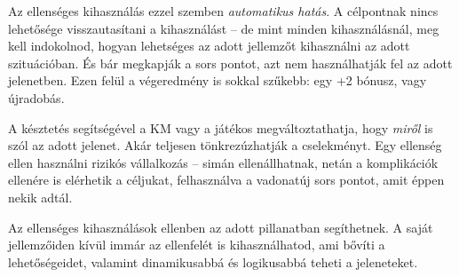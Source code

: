Az ellenséges kihasználás ezzel szemben \emph{automatikus hatás}. A célpontnak nincs lehetősége visszautasítani a kihasználást -- de mint minden kihasználásnál, meg kell indokolnod, hogyan lehetséges az adott jellemzőt kihasználni az adott szituációban. És bár megkapják a sors pontot, azt nem használhatják fel az adott jelenetben. Ezen felül a végeredmény is sokkal szűkebb: egy +2 bónusz, vagy újradobás.

A késztetés segítségével a KM vagy a játékos megváltoztathatja, hogy \emph{miről} is szól az adott jelenet. Akár teljesen tönkrezúzhatják a cselekményt. Egy ellenség ellen használni rizikós vállalkozás -- simán ellenállhatnak, netán a komplikációk ellenére is elérhetik a céljukat, felhasználva a vadonatúj sors pontot, amit éppen nekik adtál.

Az ellenséges kihasználások ellenben az adott pillanatban segíthetnek. A saját jellemzőiden kívül immár az ellenfelét is kihasználhatod, ami bővíti a lehetőségeidet, valamint dinamikusabbá és logikusabbá teheti a jeleneteket.
